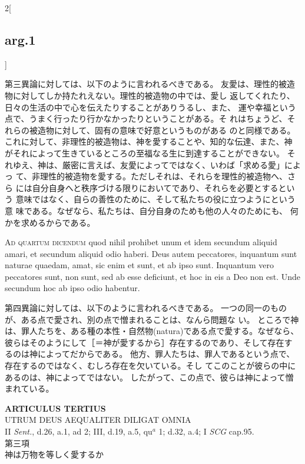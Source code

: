 \documentclass[paper=a4paper,fontsize=10pt,jafontsize=9pt,titlepage]{jlreq}
\begin{document}
\begin{paracol}{2}[\subsection{arg.1}]
\switchcolumn

第三異論に対しては、以下のように言われるべきである。
友愛は、理性的被造物に対してしか持たれえない。理性的被造物の中では、愛し
 返してくれたり、日々の生活の中で心を伝えたりすることがありうるし、また、
 運や幸福という点で、うまく行ったり行かなかったりということがある。そ
 れはちょうど、それらの被造物に対して、固有の意味で好意というものがある
 のと同様である。
これに対して、非理性的被造物は、神を愛することや、知的な伝達、また、神
 がそれによって生きているところの至福なる生に到達することができない。
それゆえ、神は、厳密に言えば、友愛によってではなく、いわば「求める愛」によっ
 て、非理性的被造物を愛する。ただしそれは、それらを理性的被造物へ、さら
 には自分自身へと秩序づける限りにおいてであり、それらを必要とするという
 意味ではなく、自らの善性のために、そして私たちの役に立つようにという意
 味である。なぜなら、私たちは、自分自身のためも他の人々のためにも、
 何かを求めるからである。

\switchcolumn*[\subsection{ad.4}]


{\scshape Ad quartum dicendum} quod nihil prohibet unum
et idem secundum aliquid amari, et secundum aliquid odio haberi. Deus
autem peccatores, inquantum sunt naturae quaedam, amat, sic enim et
sunt, et ab ipso sunt. Inquantum vero peccatores sunt, non sunt, sed ab
esse deficiunt, et hoc in eis a Deo non est. Unde secundum hoc ab ipso
odio habentur.

\switchcolumn

第四異論に対しては、以下のように言われるべきである。
一つの同一のものが、ある点で愛され、別の点で憎まれることは、なんら問題な
 い。
ところで神は、罪人たちを、ある種の本性・自然物(natura)である点で愛する。なぜなら、
 彼らはそのようにして［＝神が愛するから］存在するのであり、そして存在す
 るのは神によってだからである。
他方、罪人たちは、罪人であるという点で、存在するのではなく、むしろ存在を欠いている。そし
 てこのことが彼らの中にあるのは、神によってではない。
したがって、この点で、彼らは神によって憎まれている。

\end{paracol}
\newpage


{}
\setcounter{section}{3}
\setcounter{subsection}{0}
\begin{center}
 {\Large {\bfseries ARTICULUS TERTIUS}}\\
 {\large UTRUM DEUS AEQUALITER DILIGAT OMNIA}\\
 {\footnotesize II {\itshape Sent.}, d.26, a.1, ad 2; III, d.19, a.5,
 qu$^a$ 1; d.32, a.4; I {\itshape SCG} cap.95.}\\
 {\Large 第三項\\神は万物を等しく愛するか}
\end{center}
\end{document}
